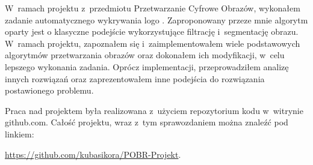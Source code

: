 W~ramach projektu z~przedmiotu Przetwarzanie Cyfrowe Obrazów, wykonałem zadanie automatycznego wykrywania logo \bk. Zaproponowany przeze mnie algorytm oparty jest o klasyczne podejście wykorzystujące filtrację i~segmentację obrazu. W~ramach projektu, zapoznałem się i~zaimplementowałem wiele podstawowych algorytmów przetwarzania obrazów oraz dokonałem ich modyfikacji, w~celu lepszego wykonania zadania. Oprócz implementacji, przeprowadziłem analizę innych rozwiązań oraz zaprezentowałem inne podejścia do rozwiązania postawionego problemu. 

Praca nad projektem była realizowana z~użyciem repozytorium kodu w~witrynie github.com. Całość projektu, wraz z~tym sprawozdaniem można znaleźć pod linkiem:
\begin{center}
\textcolor{blue}{\url{https://github.com/kubasikora/POBR-Projekt}}.
\end{center}
